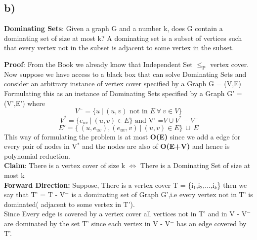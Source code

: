 \documentclass{report}
\begin{document}
 \subsection*{b)}
 \textbf{Dominating Sets}: Given a graph G and a number k, does G contain a dominating set of size at most k? A dominating set is a subset of vertices such that every vertex not in the subset is adjacent to some vertex in the subset.\vspace*{1em}\\
 \textbf{Proof}: From the Book we already know that Independent Set $\leq_\text{P}$ vertex cover. Now suppose we have access to a black box that can solve Dominating Sets and consider an arbitrary instance of vertex cover specified by a Graph G = (V,E)\vspace*{0.2em}\\
 Formulating this as an instance of Dominating Sets specified by a Graph G' = (V',E') where 
 \begin{equation*}
      V^- = \{ u\ | \ (u,v) \text{ not in } E\  \forall\  v \in V \} 
 \end{equation*}
 \begin{equation*}    
      \ V^* = \{ e_{uv} \ |\ (u,v) \in E \} \text{ and V' =} V \cup V^* - V^-
 \end{equation*}
 \begin{equation*}
     E' = \{\ (u,e_{uv}),(e_{uv},v) \ | \ (u,v) \in E \} \ \cup \ E
 \end{equation*}
 This way of formulating the problem is at most \textbf{O(E)} since we add a edge for every pair of nodes in V$^*$ and the nodes are also of \textbf{O(E+V)} and hence is polynomial reduction.\\
 \textbf{Claim}: There is a vertex cover of size k $\iff$ There is a Dominating Set of size at most k\vspace*{0.2em}\\
 \textbf{Forward Direction:} Suppose, There is a vertex cover T = \{i$_1$,i$_2$,$\dots$,i$_k$\} then we say that T' = T - V$^-$ is a dominating set of Graph G',i.e every vertex not in T' is dominated( adjacent to some vertex in T').\\
 Since Every edge is covered by a vertex cover all vertices not in T' and in V - V$^-$ are dominated by the set T' since each vertex in V - V$^-$ has an edge covered by T'.\\
\end{document}
